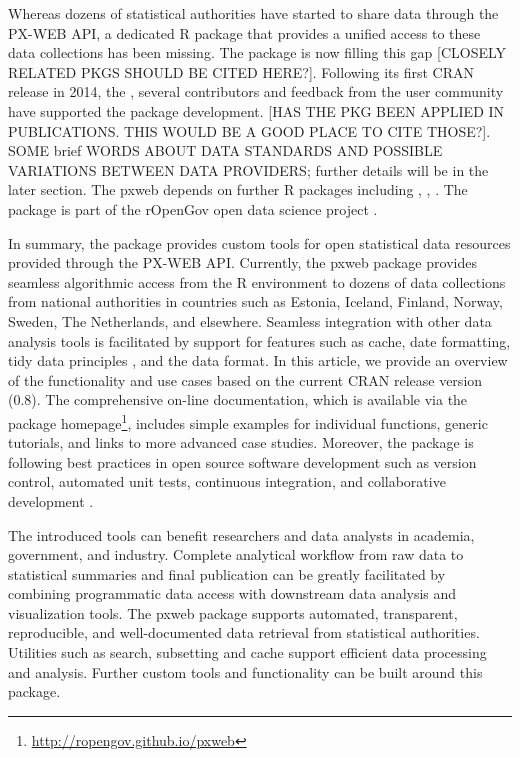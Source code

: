 \documentclass[article]{jss}
\begin{document}
Whereas dozens of statistical authorities have started to share data through the PX-WEB API, 
a dedicated R package that provides a unified access to these data collections has been missing. The  package is now filling this gap [CLOSELY RELATED PKGS SHOULD BE CITED HERE?]. Following its first CRAN release in 2014, the , several contributors and feedback from the user community have supported the package development. 
[HAS THE PKG BEEN APPLIED IN PUBLICATIONS. THIS WOULD BE A GOOD PLACE TO CITE THOSE?].  SOME brief WORDS ABOUT DATA STANDARDS AND POSSIBLE VARIATIONS BETWEEN DATA PROVIDERS; further details will be in the later section. The pxweb depends on further R packages including  \citep{checkmate},  \citep{httr},  \citep{jsonlite}. The  package is part of the rOpenGov open data science project \citep{Lahti13icml}. 

In summary, the  package provides custom tools for open statistical data resources provided through the PX-WEB API. Currently, the pxweb package provides seamless algorithmic access from the R environment to dozens of data collections from national authorities in countries such as Estonia, Iceland, Finland, Norway, Sweden, The Netherlands, and elsewhere. Seamless integration with other data analysis tools is facilitated by support for features such as cache, date formatting, tidy data principles \citep{wickham2014}, and the  \citep{tibble} data format. In this article, we provide an overview of the functionality and use cases based on the current CRAN release version (0.8). The comprehensive on-line documentation, which is available via the package homepage\footnote{\url{http://ropengov.github.io/pxweb}}, includes simple examples for individual functions, generic tutorials, and links to more advanced case studies. Moreover, the package is following best practices in open source software development such as version control, automated unit tests, continuous integration, and collaborative development \citep{PerezRiverol2016}.

The introduced tools can benefit researchers and data analysts in academia, government, and industry. Complete analytical workflow from raw data to statistical summaries and final publication can be greatly facilitated by combining programmatic data access with downstream data analysis and visualization tools. The pxweb package supports automated, transparent, reproducible, and well-documented data retrieval from statistical authorities. Utilities such as search, subsetting and cache support efficient data processing and analysis. Further custom tools and functionality can be built around this package. 
\end{document}
